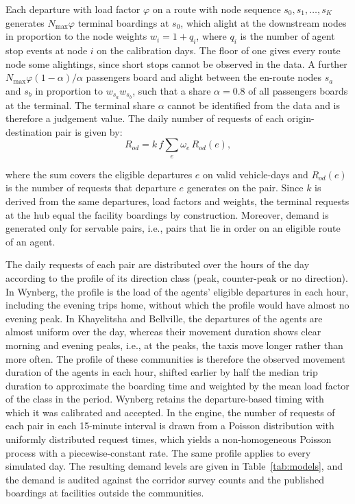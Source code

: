 Each departure with load factor \( \varphi \) on a route with node sequence \( s_0, s_1, \ldots, s_K \) generates \( N_{\text{max}}\varphi \) terminal boardings at \( s_0 \), which alight at the downstream nodes in proportion to the node weights \( w_i = 1 + q_i \), where \( q_i \) is the number of agent stop events at node \( i \) on the calibration days. The floor of one gives every route node some alightings, since short stops cannot be observed in the data. A further \( N_{\text{max}}\varphi(1 - \alpha)/\alpha \) passengers board and alight between the en-route nodes \( s_a \) and \( s_b \) in proportion to \( w_{s_a} w_{s_b} \), such that a share \( \alpha = 0.8 \) of all passengers boards at the terminal. The terminal share \( \alpha \) cannot be identified from the data and is therefore a judgement value. The daily number of requests of each origin-destination pair is given by:
\begin{equation}
    R_{od} = k\, f \sum_{e} \omega_e\, R_{od}(e),
\end{equation}

\noindent where the sum covers the eligible departures \( e \) on valid vehicle-days and \( R_{od}(e) \) is the number of requests that departure \( e \) generates on the pair. Since \( k \) is derived from the same departures, load factors and weights, the terminal requests at the hub equal the facility boardings by construction. Moreover, demand is generated only for servable pairs, i.e., pairs that lie in order on an eligible route of an agent.

The daily requests of each pair are distributed over the hours of the day according to the profile of its direction class (peak, counter-peak or no direction). In Wynberg, the profile is the load of the agents' eligible departures in each hour, including the evening trips home, without which the profile would have almost no evening peak. In Khayelitsha and Bellville, the departures of the agents are almost uniform over the day, whereas their movement duration shows clear morning and evening peaks, i.e., at the peaks, the taxis move longer rather than more often. The profile of these communities is therefore the observed movement duration of the agents in each hour, shifted earlier by half the median trip duration to approximate the boarding time and weighted by the mean load factor of the class in the period. Wynberg retains the departure-based timing with which it was calibrated and accepted. In the engine, the number of requests of each pair in each 15-minute interval is drawn from a Poisson distribution with uniformly distributed request times, which yields a non-homogeneous Poisson process with a piecewise-constant rate. The same profile applies to every simulated day. The resulting demand levels are given in Table~\ref{tab:models}, and the demand is audited against the corridor survey counts and the published boardings at facilities outside the communities.

